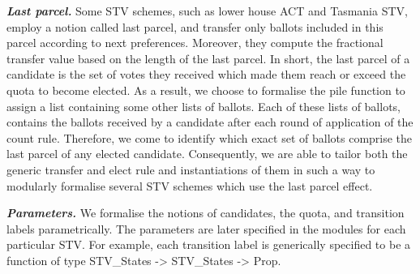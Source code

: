 \documentclass{llncs}
\begin{document}
\textbf{\emph{Last parcel.}} Some STV schemes, such as lower house ACT
and Tasmania STV, employ a notion called last parcel, and transfer
only ballots included in this parcel according to next
preferences. Moreover, they compute the fractional transfer value
based on the length of the last parcel. In short, the last parcel of a
candidate is the set of votes they received which made them reach or
exceed the quota to become elected. As a result, we choose to formalise the pile function to assign a list containing some other lists of ballots. Each of these lists of ballots, contains the ballots received by a candidate after each round of application of the count rule. Therefore, we come to identify which exact set of ballots comprise the last parcel of any elected candidate. Consequently, we are able to tailor both the generic transfer and elect rule and instantiations of them in such a way to modularly formalise several STV schemes which use the last parcel effect.


\textbf{\emph{Parameters.}} 
We formalise the notions of candidates, the quota, and transition labels parametrically. The parameters are later specified in the modules for each particular STV. For example, each transition label is generically specified to be a function of type {\selectfont STV\_States -> STV\_States -> Prop}.  
\end{document}
